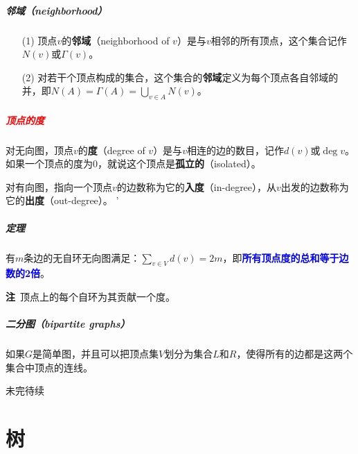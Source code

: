 \documentclass[b5paper,oneside]{ctexbook}
\newcommand{\Blue}[1]{\textcolor[named]{blue}{#1}}
\newcommand{\Red}[1]{\textcolor[named]{red}{#1}}
\begin{document}
\paragraph{邻域（neighborhood）}
\begin{enumerate}
\item [(1)] 顶点$v$的\textbf{邻域}（neighborhood of $v$）是与$v$相邻的所有顶点，这个集合记作$N(v)$或$\Gamma (v)$。

\item [(2)] 对若干个顶点构成的集合，这个集合的\textbf{邻域}定义为每个顶点各自邻域的并，即$N(A)=\Gamma (A)=\bigcup\limits_{v\in A}N(v)$。
\end{enumerate}
\paragraph{\Red{顶点的度}}
对无向图，顶点$v$的\textbf{度}（degree of $v$）是与$v$相连的边的数目，记作$d(v)$或$\deg v$。如果一个顶点的度为0，就说这个顶点是\textbf{孤立的}（isolated）。

对有向图，指向一个顶点$v$的边数称为它的\textbf{入度}（in-degree），从$v$出发的边数称为它的\textbf{出度}（out-degree）。
'
\paragraph{定理}
有$m$条边的无自环无向图满足：$\sum\limits_{v\in V}d(v)=2m$，即\Blue{\textbf{所有顶点度的总和等于边数的2倍}}。

\textbf{注}~顶点上的每个自环为其贡献一个度。

\paragraph{二分图（bipartite graphs）}如果$G$是简单图，并且可以把顶点集$V$划分为集合$L$和$R$，使得所有的边都是这两个集合中顶点的连线。

未完待续
\chapter{树}
\end{document}
